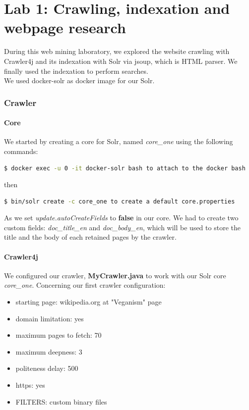 \documentclass[a4paper]{article}
\begin{document}
\part*{Lab 1: Crawling, indexation and webpage research}
During this web mining laboratory, we explored the website crawling with Crawler4j and its indexation with Solr via jsoup, which is HTML parser. We finally used the indexation to perform searches.\\

We used docker-solr as docker image for our Solr.

\section{Crawler}
\subsection{Core}
We started by creating a core for Solr, named \textit{core\_one} using the following commands:\\

\begin{lstlisting}[language=sh]
$ docker exec -u 0 -it docker-solr bash to attach to the docker bash
\end{lstlisting}

then

\begin{lstlisting}[language=sh]
$ bin/solr create -c core_one to create a default core.properties
\end{lstlisting}

As we set \textit{update.autoCreateFields} to \textbf{false} in our core. We had to create two custom fields: \textit{doc\_title\_en} and \textit{doc\_body\_en}, which will be used to store the title and the body of each retained pages by the crawler.
\\
\subsection{Crawler4j}
We configured our crawler, \textbf{MyCrawler.java} to work with our Solr core \textit{core\_one}. Concerning our first crawler configuration:\\

\begin{itemize}  
\item starting page: wikipedia.org at "Veganism" page
\item domain limitation: yes
\item maximum pages to fetch: 70
\item maximum deepness: 3
\item politeness delay: 500
\item https: yes
\item FILTERS: custom binary files
\end{itemize}
\end{document}
